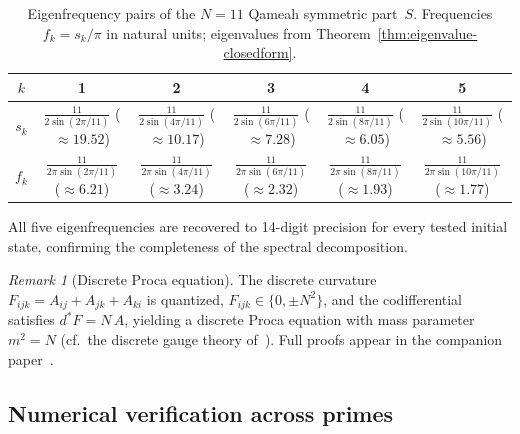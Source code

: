 \documentclass[aip,jmp,reprint,superscriptaddress,floatfix,nofootinbib]{revtex4-2}
\theoremstyle{definition}
\theoremstyle{remark}
\newtheorem{remark}[theorem]{Remark}
\begin{document}
\begin{table}[ht]
\centering
\caption{Eigenfrequency pairs of the $N{=}11$ Qameah symmetric part~$S$.
Frequencies $f_k = s_k/\pi$ in natural units; eigenvalues from
Theorem~\ref{thm:eigenvalue-closedform}.}
\label{tab:eigenfreq}
\begin{tabular}{cccccc}
\toprule
$k$ & 1 & 2 & 3 & 4 & 5 \\
\midrule
$s_k$ & $\frac{11}{2\sin(2\pi/11)}$ {\scriptsize($\approx 19.52$)} & $\frac{11}{2\sin(4\pi/11)}$ {\scriptsize($\approx 10.17$)} & $\frac{11}{2\sin(6\pi/11)}$ {\scriptsize($\approx 7.28$)} & $\frac{11}{2\sin(8\pi/11)}$ {\scriptsize($\approx 6.05$)} & $\frac{11}{2\sin(10\pi/11)}$ {\scriptsize($\approx 5.56$)} \\
$f_k$ & $\frac{11}{2\pi\sin(2\pi/11)}$ {\scriptsize($\approx 6.21$)} & $\frac{11}{2\pi\sin(4\pi/11)}$ {\scriptsize($\approx 3.24$)} & $\frac{11}{2\pi\sin(6\pi/11)}$ {\scriptsize($\approx 2.32$)} & $\frac{11}{2\pi\sin(8\pi/11)}$ {\scriptsize($\approx 1.93$)} & $\frac{11}{2\pi\sin(10\pi/11)}$ {\scriptsize($\approx 1.77$)} \\
\bottomrule
\end{tabular}
\end{table}

\noindent
All five eigenfrequencies are recovered to 14-digit precision for every
tested initial state, confirming the completeness of the spectral
decomposition.

\begin{remark}[Discrete Proca equation]
\label{rem:proca}
The discrete curvature $F_{ijk}=A_{ij}+A_{jk}+A_{ki}$ is quantized,
$F_{ijk}\in\{0,\pm N^2\}$, and the codifferential satisfies
$d^*F=N\,A$, yielding a discrete Proca equation with mass parameter
$m^2=N$ (cf.~the discrete gauge theory of~\cite{kitaev}).
Full proofs appear in the companion paper~\cite{paper3}.
\end{remark}

\subsection{Numerical verification across primes}
\end{document}
